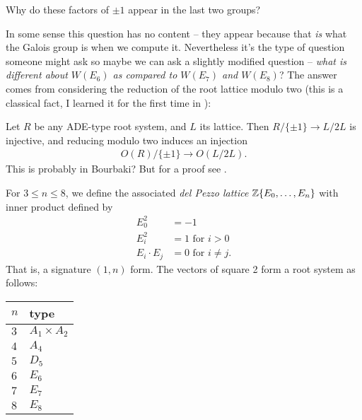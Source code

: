 \documentclass[11pt]{amsart}
\begin{document}
\begin{question}
Why do these factors of $\pm1$ appear in the last two groups?
\end{question}

In some sense this question has no content -- they appear because that \textit{is} what the Galois group is when we compute it. Nevertheless it's the type of question someone might ask so maybe we can ask a slightly modified question -- \textit{what is different about $W(E_6)$ as compared to $W(E_7)$ and $W(E_8)$}? The answer comes from considering the reduction of the root lattice modulo two (this is a classical fact, I learned it for the first time in \cite{Looijenga-monster}):

\begin{proposition} Let $R$ be any ADE-type root system, and $L$ its lattice. Then $R/\{\pm 1\} \to L/2L$ is injective, and reducing modulo two induces an injection
\begin{align*}
    O(R)/\{\pm 1\} \to O(L/2L).
\end{align*}
This is probably in Bourbaki? But for a proof see \cite{Beauville_delPezzo_lattices}.
\end{proposition}

\begin{definition} For $3\le n\le 8$, we define the associated \textit{del Pezzo lattice} $\mathbb{Z}\{E_0, \ldots, E_n\}$ with inner product defined by
\begin{align*}
    E_0^2 &= -1\\
    E_i^2 &= 1\text{ for }i>0\\
    E_i\cdot E_j &= 0 \text{ for }i\ne j.
\end{align*}
That is, a signature $(1,n)$ form. The vectors of square 2 form a root system as follows:
\begin{center}
    \begin{tabular}{l | l}
    $n$ & type \\
    \hline
    $3$ & $A_1 \times A_2$\\
    $4$ & $A_4$ \\
    $5$ & $D_5$ \\
    $6$ & $E_6$ \\
    $7$ & $E_7$ \\
    $8$ & $E_8$
    \end{tabular}
\end{center}
\end{definition}
\end{document}
